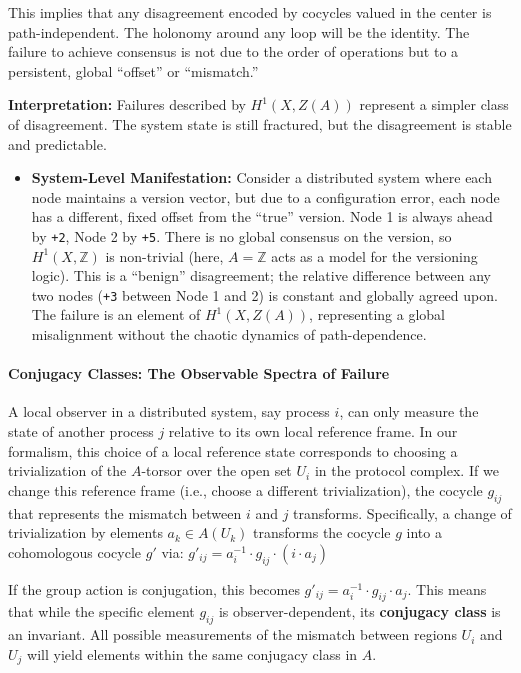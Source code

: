 \documentclass[
]{article}
\providecommand{\tightlist}{%
  \setlength{\itemsep}{0pt}\setlength{\parskip}{0pt}}
\begin{document}
This implies that any disagreement encoded by cocycles valued in the
center is path-independent. The holonomy around any loop will be the
identity. The failure to achieve consensus is not due to the order of
operations but to a persistent, global ``offset'' or ``mismatch.''

\textbf{Interpretation:} Failures described by \(H^1(X, Z(A))\)
represent a simpler class of disagreement. The system state is still
fractured, but the disagreement is stable and predictable.

\begin{itemize}
\tightlist
\item
  \textbf{System-Level Manifestation:} Consider a distributed system
  where each node maintains a version vector, but due to a configuration
  error, each node has a different, fixed offset from the ``true''
  version. Node 1 is always ahead by \texttt{+2}, Node 2 by \texttt{+5}.
  There is no global consensus on the version, so \(H^1(X, \mathbb{Z})\)
  is non-trivial (here, \(A = \mathbb{Z}\) acts as a model for the
  versioning logic). This is a ``benign'' disagreement; the relative
  difference between any two nodes (\texttt{+3} between Node 1 and 2) is
  constant and globally agreed upon. The failure is an element of
  \(H^1(X, Z(A))\), representing a global misalignment without the
  chaotic dynamics of path-dependence.
\end{itemize}

\paragraph{Conjugacy Classes: The Observable Spectra of
Failure}\label{conjugacy-classes-the-observable-spectra-of-failure}

A local observer in a distributed system, say process \(i\), can only
measure the state of another process \(j\) relative to its own local
reference frame. In our formalism, this choice of a local reference
state corresponds to choosing a trivialization of the \(A\)-torsor over
the open set \(U_i\) in the protocol complex. If we change this
reference frame (i.e., choose a different trivialization), the cocycle
\(g_{ij}\) that represents the mismatch between \(i\) and \(j\)
transforms. Specifically, a change of trivialization by elements
\(a_k \in A(U_k)\) transforms the cocycle \(g\) into a cohomologous
cocycle \(g'\) via:
\(g'_{ij} = a_i^{-1} \cdot g_{ij} \cdot (i \cdot a_j)\)

If the group action is conjugation, this becomes
\(g'_{ij} = a_i^{-1} \cdot g_{ij} \cdot a_j\). This means that while the
specific element \(g_{ij}\) is observer-dependent, its \textbf{conjugacy
class} is an invariant. All possible measurements of the mismatch
between regions \(U_i\) and \(U_j\) will yield elements within the same
conjugacy class in \(A\).
\end{document}
